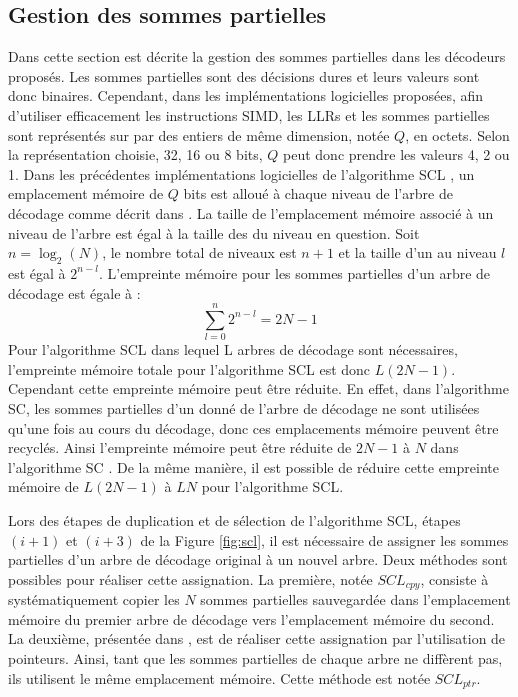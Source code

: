 \subsection{Gestion des sommes partielles}
Dans cette section est décrite la gestion des sommes partielles dans les décodeurs proposés.
Les sommes partielles sont des décisions dures et leurs valeurs sont donc binaires. Cependant, dans les implémentations logicielles proposées, afin d'utiliser efficacement les instructions SIMD, les LLRs et les sommes partielles sont représentés sur par des entiers de même dimension, notée $Q$, en octets. Selon la représentation choisie, 32, 16 ou 8 bits, $Q$ peut donc prendre les valeurs 4, 2 ou 1. 
Dans les précédentes implémentations logicielles de l'algorithme SCL \cite{sarkis_fast_2016,sarkis_increasing_2014,shen_low-latency_2016}, un emplacement mémoire de $Q$ bits est alloué à chaque niveau de l'arbre de décodage comme décrit dans \cite{tal_list_2011}. La taille de l'emplacement mémoire associé à un niveau de l'arbre est égal à la taille des \noeuds du niveau en question. Soit $n=\log_2(N)$, le nombre total de niveaux est $n+1$ et la taille d'un \noeud au niveau $l$ est égal à $2^{n-l}$. L'empreinte mémoire pour les sommes partielles d'un arbre de décodage est égale à : 
\begin{equation}
\sum^n_{l=0}2^{n-l}=2N-1
\end{equation}
Pour l'algorithme SCL dans lequel L arbres de décodage sont nécessaires, l'empreinte mémoire totale pour l'algorithme SCL est donc $L(2N-1)$. Cependant cette empreinte mémoire peut être réduite. En effet, dans l'algorithme SC, les sommes partielles d'un \noeud donné de l'arbre de décodage ne sont utilisées qu'une fois au cours du décodage, donc ces emplacements mémoire peuvent être recyclés. Ainsi l'empreinte mémoire peut être réduite de $2N-1$ à $N$ dans l'algorithme SC \cite{leroux_hardware_2011}. De la même manière, il est possible de réduire cette empreinte mémoire de $L(2N-1)$ à $LN$ pour l'algorithme SCL.

Lors des étapes de duplication et de sélection de l'algorithme SCL, étapes $(i+1)$ et $(i+3)$ de la Figure \ref{fig:scl}, il est nécessaire de assigner les sommes partielles d'un arbre de décodage original à un nouvel arbre. Deux méthodes sont possibles pour réaliser cette assignation. La première, notée $SCL_{cpy}$, consiste à systématiquement copier les $N$ sommes partielles sauvegardée dans l'emplacement mémoire du premier arbre de décodage vers l'emplacement mémoire du second. La deuxième, présentée dans \cite{tal_list_2011}, est de réaliser cette assignation par l'utilisation de pointeurs. Ainsi, tant que les sommes partielles de chaque arbre ne diffèrent pas, ils utilisent le même emplacement mémoire. Cette méthode est notée $SCL_{ptr}$.

